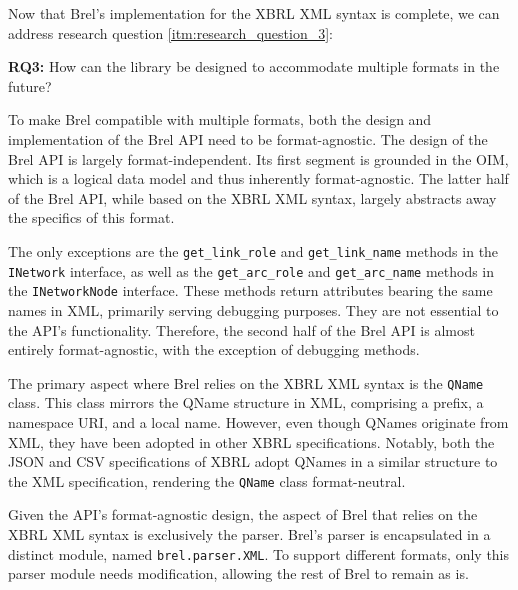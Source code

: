 Now that Brel's implementation for the XBRL XML syntax is complete, we can address research question \ref{itm:research_question_3}:

\begin{displayquote}
    \textbf{RQ3:} How can the library be designed to accommodate multiple formats in the future?
\end{displayquote}

To make Brel compatible with multiple formats, both the design and implementation of the Brel API need to be format-agnostic. 
The design of the Brel API is largely format-independent. 
Its first segment is grounded in the OIM, which is a logical data model and thus inherently format-agnostic.
The latter half of the Brel API, while based on the XBRL XML syntax, largely abstracts away the specifics of this format. 

The only exceptions are the \texttt{get\_link\_role} and \texttt{get\_link\_name} methods in the \texttt{INetwork} interface, 
as well as the \texttt{get\_arc\_role} and \texttt{get\_arc\_name} methods in the \texttt{INetworkNode} interface. 
These methods return attributes bearing the same names in XML, primarily serving debugging purposes.
They are not essential to the API's functionality.
Therefore, the second half of the Brel API is almost entirely format-agnostic, with the exception of debugging methods.

The primary aspect where Brel relies on the XBRL XML syntax is the \texttt{QName} class.
This class mirrors the QName structure in XML, comprising a prefix, a namespace URI, and a local name. 
However, even though QNames originate from XML, they have been adopted in other XBRL specifications.
Notably, both the JSON\cite{xbrl_json} and CSV\cite{xbrl_csv} specifications of XBRL adopt QNames in a similar structure to the XML specification, 
rendering the \texttt{QName} class format-neutral.

Given the API's format-agnostic design, the aspect of Brel that relies on the XBRL XML syntax is exclusively the parser. 
Brel's parser is encapsulated in a distinct module, named \texttt{brel.parser.XML}. 
To support different formats, only this parser module needs modification, allowing the rest of Brel to remain as is.
